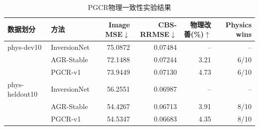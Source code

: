 \begin{table}[htbp]
\centering
\caption{PGCR物理一致性实验结果}
\label{tab:pgcr_physics}
\begin{tabular}{llrrrr}
\toprule
数据划分 & 方法 &
Image MSE$\downarrow$ &
CBS-RRMSE$\downarrow$ &
物理改善(\%)$\uparrow$ &
Physics wins \\
\midrule
phys-dev10 & InversionNet & 75.0872 & 0.07484 & -- & -- \\
 & AGR-Stable & 72.1488 & 0.07244 & 3.21 & 6/10 \\
 & PGCR-v1 & 73.9449 & 0.07130 & 4.73 & 6/10 \\
\midrule
phys-heldout10 & InversionNet & 56.2551 & 0.06987 & -- & -- \\
 & AGR-Stable & 54.4267 & 0.06713 & 3.91 & 8/10 \\
 & PGCR-v1 & 54.5347 & 0.06683 & 4.35 & 8/10 \\
\midrule
\bottomrule
\end{tabular}
\end{table}
